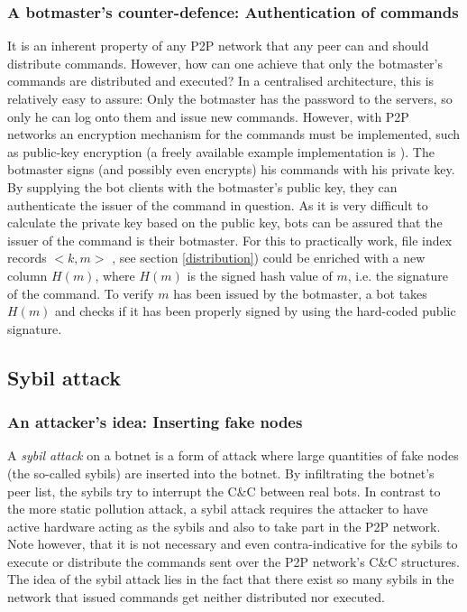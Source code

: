 \documentclass{llncs}
\begin{document}
\subsubsection{A botmaster's counter-defence: Authentication of commands}
It is an inherent property of any P2P network that any peer can and
should distribute commands. However, how can one achieve that only the
botmaster's commands are distributed and executed? In a centralised
architecture, this is relatively easy to assure: Only the botmaster
has the password to the servers, so only he can log onto them and
issue new commands. However, with P2P networks an encryption mechanism
for the commands must be implemented, such as public-key encryption (a
freely available example implementation is \cite{GPG}). The botmaster
signs (and possibly even encrypts) his commands with his private
key. By supplying the bot clients with the botmaster's public key,
they can authenticate the issuer of the command in question. As it is
very difficult to calculate the private key based on the public key,
bots can be assured that the issuer of the command is their
botmaster. For this to practically work, file index records $<k, m>$ ,
see section \ref{distribution}) could be enriched with a new column $H(m)$,
where $H(m)$ is the signed hash value of $m$, i.e. the signature of the
command.\cite{wang2009systematic} To verify $m$ has been issued by the
botmaster, a bot takes $H(m)$ and checks if it has been properly
signed by using the hard-coded public signature.


\subsection{Sybil attack}
\label{sybilattack}
\subsubsection{An attacker's idea: Inserting fake nodes}
A {\it sybil attack} on a botnet is a form of attack where large
quantities of fake nodes (the so-called sybils) are inserted into
the botnet. By infiltrating the botnet's peer list, the sybils try to
interrupt the C\&C between real bots. In contrast to the more static
pollution attack, a sybil attack requires the attacker to have active
hardware acting as the sybils and also to take part in the P2P
network. Note however, that it is not necessary and even
contra-indicative for the sybils to execute or distribute the commands
sent over the P2P network's C\&C structures. The idea of the sybil
attack lies in the fact that there exist so many sybils in the network
that issued commands get neither distributed nor executed. \cite{davis2008sybil}
\end{document}
